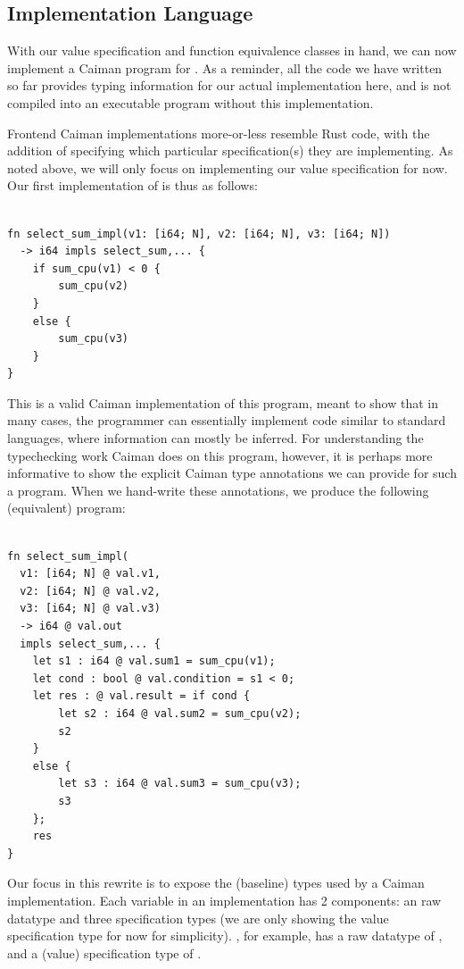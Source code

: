 \subsection{Implementation Language}
\label{subsec:implementation}

With our value specification and function equivalence classes in hand, we can now implement a Caiman program for .  As a reminder, all the code we have written so far provides typing information for our actual implementation here, and is not compiled into an executable program without this implementation.

Frontend Caiman implementations more-or-less resemble Rust code, with the addition of specifying which particular specification(s) they are implementing.  As noted above, we will only focus on implementing our value specification for now.  Our first implementation of  is thus as follows:
%
\begin{lstlisting}

fn select_sum_impl(v1: [i64; N], v2: [i64; N], v3: [i64; N]) 
  -> i64 impls select_sum,... {
    if sum_cpu(v1) < 0 { 
        sum_cpu(v2)
    }
    else {
        sum_cpu(v3)
    }
}
\end{lstlisting}
%
This is a valid Caiman implementation of this program, meant to show that in many cases, the programmer can essentially implement code similar to standard languages, where information can mostly be inferred.  For understanding the typechecking work Caiman does on this program, however, it is perhaps more informative to show the explicit Caiman type annotations we can provide for such a program.  When we hand-write these annotations, we produce the following (equivalent) program:
%
\begin{lstlisting}

fn select_sum_impl(
  v1: [i64; N] @ val.v1,
  v2: [i64; N] @ val.v2,
  v3: [i64; N] @ val.v3)
  -> i64 @ val.out
  impls select_sum,... {
    let s1 : i64 @ val.sum1 = sum_cpu(v1);
    let cond : bool @ val.condition = s1 < 0;
    let res : @ val.result = if cond {
        let s2 : i64 @ val.sum2 = sum_cpu(v2);
        s2
    }
    else {
        let s3 : i64 @ val.sum3 = sum_cpu(v3);
        s3
    };
    res
}
\end{lstlisting}
%
Our focus in this rewrite is to expose the (baseline) types used by a Caiman implementation.  Each variable in an implementation has 2 components: an raw datatype and three specification types (we are only showing the value specification type for now for simplicity).  , for example, has a raw datatype of , and a (value) specification type of .

